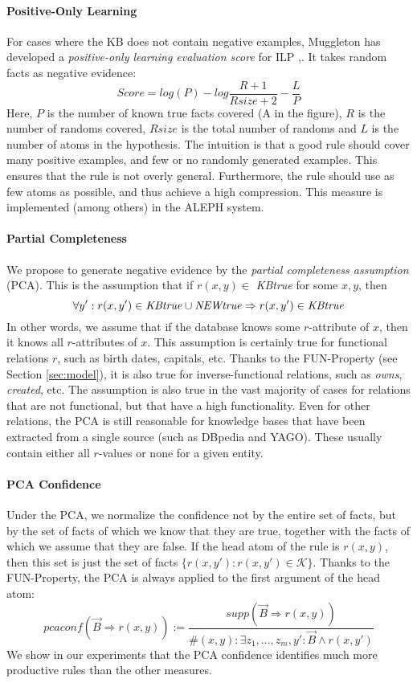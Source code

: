 \paragraph{Positive-Only Learning} For cases where the KB does not contain negative examples, Muggleton has developed a \emph{positive-only learning evaluation score} for ILP \cite{Muggleton:1996:LPD:647996.742465},\cite{usir1753}. 
It takes random facts as negative evidence:
\[
 Score = log(P)-log\frac{R+1}{Rsize+2}-\frac{L}{P}
\]
Here, $P$ is the number of known true facts covered (A in the figure), $R$ is the number of randoms covered, $Rsize$ is the total number of randoms and $L$ is the number of atoms in the hypothesis. 
The intuition is that a good rule should cover many positive examples, and few or no randomly generated examples. This ensures  
that the rule is not overly general. Furthermore, the rule should use as few atoms as possible, and thus achieve a high compression. This measure is implemented (among others) in the ALEPH system.

\paragraph{Partial Completeness} We propose to generate negative evidence by the \emph{partial completeness assumption} (PCA).
This is the assumption that if $r(x,y) \in$ \emph{KBtrue} for some $x,y$, then
\[\forall y': r(x,y') \in \mbox{\emph{KBtrue}} \cup \mbox{\emph{NEWtrue}} \Rightarrow r(x,y') \in \mbox{\emph{KBtrue}}\] 
In other words, we assume that if the database knows some $r$-attribute of $x$, then it knows all $r$-attributes of $x$. This assumption is certainly true for functional relations $r$, 
such as birth dates, capitals, etc. Thanks to the FUN-Property (see Section \ref{sec:model}), it is also true for inverse-functional relations, such as \emph{owns}, \emph{created}, etc. 
The assumption is also true in the vast majority of cases for relations that are not functional, but that have a high functionality. 
Even for other relations, the PCA is still reasonable for knowledge bases that have been extracted from a single source (such as DBpedia and YAGO). 
These usually contain either all $r$-values or none for a given entity.

\paragraph{PCA Confidence} Under the PCA, we normalize the confidence not by the entire set of facts, but by the set of facts of which we know that they are true, together with the facts of which we assume that they are false. If the head atom of the rule is $r(x,y)$, then this set is just the set of facts $\{ r(x,y') : r(x,y') \in \mathcal{K}\}$. Thanks to the FUN-Property, the PCA is always applied to the first argument of the head atom:
\[pcaconf(\vec{B} \Rightarrow r(x,y)) := \frac{supp(\vec{B} \Rightarrow r(x,y))}{\#(x,y): \exists z_1,...,z_m,y': \vec{B} \wedge r(x,y')}\]
We show in our experiments that the PCA confidence identifies much more productive rules than the other measures.


